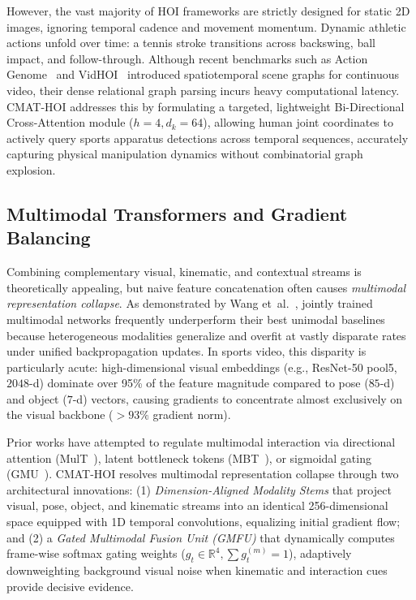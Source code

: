 However, the vast majority of HOI frameworks are strictly designed for static 2D images, ignoring temporal cadence and movement momentum. Dynamic athletic actions unfold over time: a tennis stroke transitions across backswing, ball impact, and follow-through. Although recent benchmarks such as Action Genome~\cite{ji2020action} and VidHOI~\cite{chao2021vidhoi} introduced spatiotemporal scene graphs for continuous video, their dense relational graph parsing incurs heavy computational latency. CMAT-HOI addresses this by formulating a targeted, lightweight Bi-Directional Cross-Attention module ($h=4, d_k=64$), allowing human joint coordinates to actively query sports apparatus detections across temporal sequences, accurately capturing physical manipulation dynamics without combinatorial graph explosion.

\subsection{Multimodal Transformers and Gradient Balancing}
Combining complementary visual, kinematic, and contextual streams is theoretically appealing, but naive feature concatenation often causes \textit{multimodal representation collapse}. As demonstrated by Wang et~al.~\cite{wang2020makes}, jointly trained multimodal networks frequently underperform their best unimodal baselines because heterogeneous modalities generalize and overfit at vastly disparate rates under unified backpropagation updates. In sports video, this disparity is particularly acute: high-dimensional visual embeddings (e.g., ResNet-50 pool5, $2048$-d) dominate over 95\% of the feature magnitude compared to pose ($85$-d) and object ($7$-d) vectors, causing gradients to concentrate almost exclusively on the visual backbone ($>93\%$ gradient norm).

Prior works have attempted to regulate multimodal interaction via directional attention (MulT~\cite{tsai2019multimodal}), latent bottleneck tokens (MBT~\cite{nagrani2021attention}), or sigmoidal gating (GMU~\cite{arevalo2017gated}). CMAT-HOI resolves multimodal representation collapse through two architectural innovations: (1) \textit{Dimension-Aligned Modality Stems} that project visual, pose, object, and kinematic streams into an identical 256-dimensional space equipped with 1D temporal convolutions, equalizing initial gradient flow; and (2) a \textit{Gated Multimodal Fusion Unit (GMFU)} that dynamically computes frame-wise softmax gating weights ($g_t \in \mathbb{R}^4, \sum g_t^{(m)} = 1$), adaptively downweighting background visual noise when kinematic and interaction cues provide decisive evidence.
